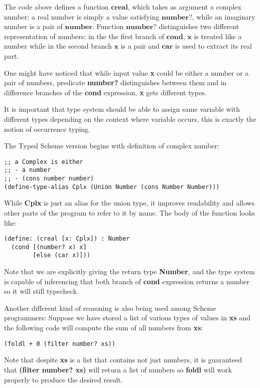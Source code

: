 The code above defines a function $\textbf{creal}$, which takes as argument
a complex number: a real number is simply a value satisfying $\textbf{number?}$,
while an imaginary number is a pair of $\textbf{number}$.
Function $\textbf{number?}$ distinguishes two different representation of numbers:
in the the first branch of $\textbf{cond}$, $\textbf{x}$ is treated like a number
while in the second branch $\textbf{x}$ is a pair and $\textbf{car}$ is used
to extract its real part.

One might have noticed that
while input value \textbf{x} could be either a number or a pair of numbers,
predicate \textbf{number?} distinguishes between them and
in difference branches of the \textbf{cond} expression, \textbf{x} gets different types.

It is important that type system should be able to assign same variable with different
types depending on the context where variable occurs, this is exactly the notion of
occurrence typing.

The Typed Scheme version begins with definition of complex number:

\begin{verbatim}
;; a Complex is either
;; - a number
;; - (cons number number)
(define-type-alias Cplx (Union Number (cons Number Number)))
\end{verbatim}

While \textbf{Cplx} is just an alias for the union type, it improves readability
and allows other parts of the program to refer to it by name.
The body of the function looks like:

\begin{verbatim}
(define: (creal [x: Cplx]) : Number
  (cond [(number? x) x]
        [else (car x)]))
\end{verbatim}

Note that we are explicitly giving the return type \textbf{Number},
and the type system is capable of inferencing that
both branch of \textbf{cond} expression returns a number
so it will still typecheck.

Another different kind of reasoning is also being used among Scheme programmers:
Suppose we have stored a list of various types of values in \textbf{xs}
and the following code will compute the sum of all numbers from \textbf{xs}:

\begin{verbatim}
(foldl + 0 (filter number? xs))
\end{verbatim}

Note that despite \textbf{xs} is a list that contains not just numbers,
it is guaranteed that \textbf{(filter number? xs)} will return a list of numbers
so \textbf{foldl} will work properly to produce the desired result.

